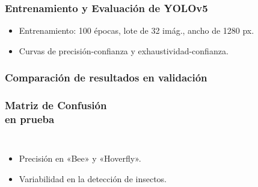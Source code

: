 \begin{frame}
    \frametitle{Entrenamiento y Evaluación de YOLOv5}
    \vspace*{-1mm}
    \begin{itemize}
        \item Entrenamiento: 100 épocas, lote de 32 imág., ancho de 1280 px.
        \item Curvas de precisión-confianza y exhaustividad-confianza.
    \end{itemize}
    \vspace*{-3mm}
    \begin{center}
        \hspace*{3mm}
    \end{center}
\end{frame}


\begin{frame}
    \frametitle{Comparación de resultados en validación}
    \vspace*{-0.7cm}
    \begin{center}
    \end{center}
\end{frame}


\begin{frame}
    \frametitle{Matriz de Confusión\\ en prueba}
    \vspace*{-1.6cm}
    \begin{columns}
        \vspace*{-0.6cm}
        \begin{itemize}
            \item Precisión en «Bee» y «Hoverfly».
            \item Variabilidad en la detección de insectos.
        \end{itemize}
        \begin{center}
        \end{center}
    \end{columns}
\end{frame}



